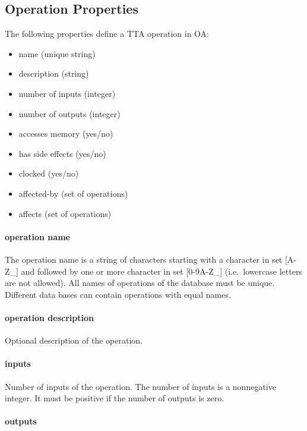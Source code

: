 \documentclass[a4paper,twoside]{tceusermanual}
\begin{document}
\subsection{Operation Properties}
\label{ssec:operation-properties}

The following properties define a TTA operation in OA:

\begin{itemize}
\item name (unique string)
\item description (string)
\item number of inputs (integer)
\item number of outputs (integer)
\item accesses memory (yes/no)
\item has side effects (yes/no)
\item clocked (yes/no)
\item affected-by (set of operations)
\item affects (set of operations)
\end{itemize}

\paragraph{operation name}
The operation name is a string of characters starting with a character in
set [A-Z\_] and followed by one or more character in set [0-9A-Z\_] 
(i.e.\ lowercase letters are not allowed).  All
names of operations of the database must be unique. Different data bases 
can contain operations with equal names. 

\paragraph{operation description}
Optional description of the operation.

\paragraph{inputs}
Number of inputs of the operation. The number of inputs is a
nonnegative integer. It must be positive if the number of outputs is
zero.

\paragraph{outputs}
\end{document}

